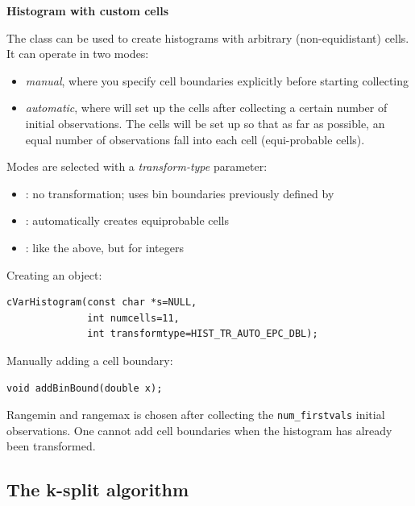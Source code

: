 \textbf{Histogram with custom cells}


The  class can be used to create
histograms with arbitrary (non-equidistant) cells.
It can operate in two modes:

\begin{itemize}
  \item \textit{manual}, where you specify cell boundaries explicitly
     before starting collecting
  \item \textit{automatic}, where  will set up the cells
     after collecting a certain number of initial observations. The cells
     will be set up so that as far as possible, an equal number of observations
     fall into each cell (equi-probable cells).
\end{itemize}

Modes are selected with a \textit{transform-type} parameter:
\begin{itemize}
  \item{: no transformation; uses bin boundaries
    previously defined by }
  \item{: automatically creates equiprobable cells}
  \item{: like the above, but for integers}
\end{itemize}

Creating an object:

\begin{verbatim}
cVarHistogram(const char *s=NULL,
              int numcells=11,
              int transformtype=HIST_TR_AUTO_EPC_DBL);
\end{verbatim}

Manually adding a cell boundary:

\begin{verbatim}
void addBinBound(double x);
\end{verbatim}

Rangemin and rangemax is chosen after collecting the
\texttt{num\_firstvals} initial observations. One cannot add cell
boundaries when the histogram has already been transformed.





\subsection{The k-split algorithm}

